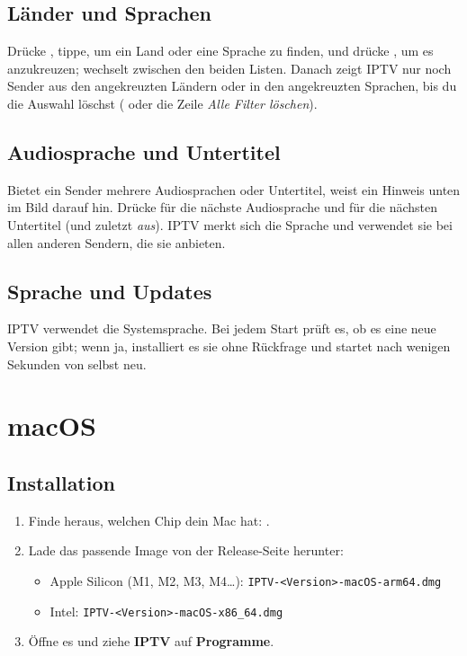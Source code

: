 \subsection{Länder und Sprachen}
Drücke , tippe, um ein Land oder eine Sprache zu finden, und drücke
, um es anzukreuzen;  wechselt zwischen den beiden
Listen. Danach zeigt IPTV nur noch Sender aus den angekreuzten Ländern oder
in den angekreuzten Sprachen, bis du die Auswahl löschst ( oder die
Zeile \emph{Alle Filter löschen}).

\subsection{Audiosprache und Untertitel}
Bietet ein Sender mehrere Audiosprachen oder Untertitel, weist ein Hinweis
unten im Bild darauf hin. Drücke  für die nächste Audiosprache und
 für die nächsten Untertitel (und zuletzt \emph{aus}). IPTV merkt sich
die Sprache und verwendet sie bei allen anderen Sendern, die sie anbieten.

\subsection{Sprache und Updates}
IPTV verwendet die Systemsprache. Bei jedem Start prüft es, ob es eine neue
Version gibt; wenn ja, installiert es sie ohne Rückfrage und startet nach
wenigen Sekunden von selbst neu.

\section{macOS}

\subsection{Installation}
\begin{enumerate}
  \item Finde heraus, welchen Chip dein Mac hat: .
  \item Lade das passende Image von der Release-Seite herunter:
  \begin{itemize}
    \item Apple Silicon (M1, M2, M3, M4\ldots):
          \texttt{IPTV-\textless Version\textgreater-macOS-arm64.dmg}
    \item Intel: \texttt{IPTV-\textless Version\textgreater-macOS-x86\_64.dmg}
  \end{itemize}
  \item Öffne es und ziehe \textbf{IPTV} auf \textbf{Programme}.
\end{enumerate}

